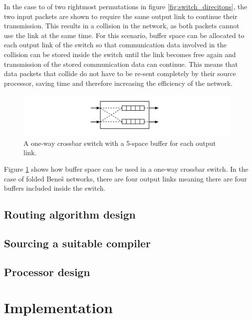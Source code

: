 \documentclass[a4paper, 12pt]{article}
\begin{document}
In the case to of two rightmost permutations in figure \ref{fig:switch_direcitons}, the two input packets are shown to require the same output link to continue their transmission. This results in a collision in the network, as both packets cannot use the link at the same time. For this scenario, buffer space can be allocated to each output link of the switch so that communication data involved in the collision can be stored inside the switch until the link becomes free again and transmission of the stored communication data can continue. This means that data packets that collide do not have to be re-sent completely by their source processor, saving time and therefore increasing the efficiency of the network.

\begin{figure}[H]
\centering
\includegraphics[width=\textwidth]{switch_buffer.png}
\caption[A one-way crossbar switch with a 5-space buffer for each output link]{A one-way crossbar switch with a 5-space buffer for each output link.}
\label{fig:switch_buffer}
\end{figure}

Figure \ref{fig:switch_buffer} shows how buffer space can be used in a one-way crossbar switch. In the case of folded Bene\v{s} networks, there are four output links meaning there are four buffers included inside the switch.

\subsection{Routing algorithm design}



\subsection{Sourcing a suitable compiler}



\subsection{Processor design}


\newpage
\section{Implementation}
\end{document}
